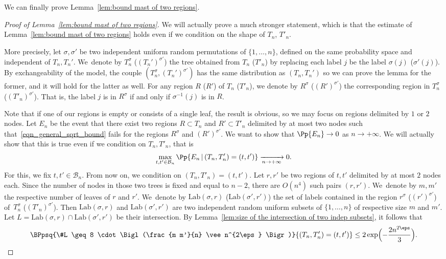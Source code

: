 We can finally prove Lemma~\ref{lem:bound mast of two regions}.
\begin{proof}[Proof of Lemma~\ref{lem:bound mast of two regions}]
We will actually prove a much stronger statement, which is that the estimate of Lemma~\ref{lem:bound mast of two regions} holds even if we condition on the shape of $T_n$, $T'_n$.

More precisely, let $\sigma,\sigma'$ be two independent uniform random permutations of $\{1,\dots,n\}$, defined on the same probability space and independent of $T_n, T_n'$. We~denote by $T_n^\sigma$ (\resp $(T_n')^{\sigma'}$) the tree obtained from $T_n$ (\resp $T'_n$) by replacing each label $j$ be the label $\sigma(j)$ (\resp $\sigma'(j)$). By exchangeability of the model, the couple $(T_n^\sigma,(T_n')^{\sigma'})$ has the same distribution as $(T_n,T_n')$ so we can prove the lemma for the former, and it will hold for the latter as well. For any region $R$ (\resp $R'$) of $T_n$ (\resp $T'_n$), we denote by $R^{\sigma}$ (\resp $(R')^{\sigma'}$) the corresponding region in $T_n^{\sigma}$ (\resp $(T'_n)^{\sigma'}$). That is, the label $j$ is in $R^{\sigma}$ if and only if $\sigma^{-1}(j)$ is in $R$.

Note that if one of our regions is empty or consists of a single leaf, the result is obvious, so we may focus on regions delimited by $1$ or $2$ nodes.
Let $E_n$ be the event that there exist two regions $R \subset T_n$ and $R' \subset T'_n$ delimited by at most two nodes such that~\eqref{eqn_general_sqrt_bound} fails for the regions $R^{\sigma}$ and $(R')^{\sigma'}$.
We want to show that $\Pp{E_n} \to 0$ as $n \to +\infty$.
We will actually show that this is true even if we condition on $T_n, T'_n$, that is
\begin{align}\label{eqn:sqrt_bound_conditioned_on_shape}
\max_{t,t' \in \mathcal{B}_n} \Pp{E_n \, | \, (T_n, T'_n)=(t,t')} \xrightarrow[n \to +\infty]{} 0.
\end{align}
For this, we fix $t,t' \in \mathcal{B}_n$.
From now on, we condition on $(T_n,T'_n)=(t,t')$.
Let $r,r'$ be two regions of $t,t'$ delimited by at most $2$ nodes each.
Since the number of nodes in those two trees is fixed and equal to $n-2$, there are $O(n^4)$ such pairs $(r,r')$.
We~denote by $m,m'$ the respective number of leaves of $r$ and $r'$.
We~denote by $\mathrm{Lab}(\sigma,r)$ (\resp $\mathrm{Lab}(\sigma',r')$) the set of labels contained in the region $r^{\sigma}$ (\resp $(r')^{\sigma'}$) of~$T_n^{\sigma}$ (\resp $(T'_n)^{\sigma'}$).
Then $\mathrm{Lab}(\sigma,r)$ and $\mathrm{Lab}(\sigma',r')$ are two independent random uniform subsets of $\{1,\dots,n\}$ of respective size $m$ and $m'$. Let $L=\mathrm{Lab}(\sigma,r)\cap \mathrm{Lab}(\sigma',r')$ be their intersection. By Lemma~\ref{lem:size of the intersection of two indep subsets}, it follows that
\begin{equation}\label{eqn:conditioned_sqrt_bound_step1}
\BPpsq{\#L \geq 8 \cdot \Bigl(\frac{m m'}{n} \vee n^{2\eps} \Bigr)}{ (T_n,T'_n)=(t,t')} \leq 2 \exp\Bigl(-\frac{2n^{2\eps}}{3}\Bigr).
\end{equation}


\end{proof}
